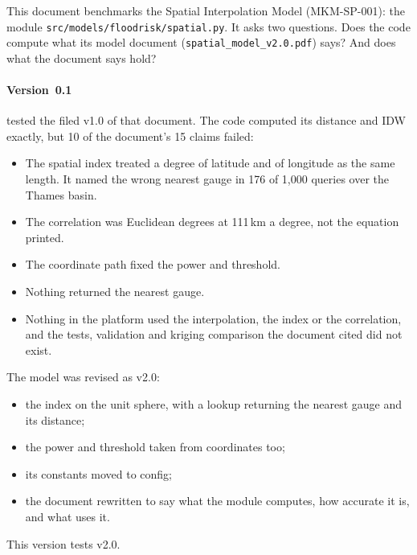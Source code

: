 \documentclass[11pt,a4paper]{article}
\begin{document}
\sloppy

\mkmtitlepage
\mkmlegalpage

\tableofcontents
\clearpage

\mkmexecsummary

This document benchmarks the Spatial Interpolation Model (MKM-SP-001): the module
\texttt{src/models/floodrisk/spatial.py}. It asks two questions. Does the code compute what
its model document (\texttt{spatial\_model\_v2.0.pdf}) says? And does what the document
says hold?

\paragraph{Version~0.1} tested the filed v1.0 of that document. The code computed its
distance and IDW exactly, but 10 of the document's 15 claims failed:
\begin{itemize}[leftmargin=*,nosep]
\item The spatial index treated a degree of latitude and of longitude as the same length.
  It named the wrong nearest gauge in 176 of 1{,}000 queries over the Thames basin.
\item The correlation was Euclidean degrees at 111\,km a degree, not the equation printed.
\item The coordinate path fixed the power and threshold.
\item Nothing returned the nearest gauge.
\item Nothing in the platform used the interpolation, the index or the correlation, and
  the tests, validation and kriging comparison the document cited did not exist.
\end{itemize}
The model was revised as v2.0:
\begin{itemize}[leftmargin=*,nosep]
\item the index on the unit sphere, with a lookup returning the nearest gauge and its
  distance;
\item the power and threshold taken from coordinates too;
\item its constants moved to config;
\item the document rewritten to say what the module computes, how accurate it is, and
  what uses it.
\end{itemize}
This version tests v2.0.
\end{document}
